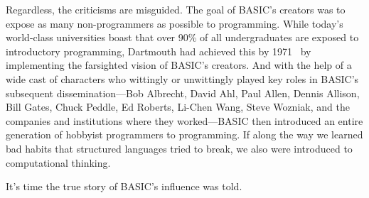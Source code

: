 Regardless, the criticisms are misguided.
The goal of BASIC's creators was to expose as many non-programmers as
possible to programming.
While today's world-class universities boast that over 90\% of all
undergraduates are exposed to introductory programming, Dartmouth had
achieved this by 1971~\cite{man_and_computer} by implementing the
farsighted vision of BASIC's creators.
And with the help of a wide cast of characters who wittingly or
unwittingly played key roles in BASIC's subsequent dissemination---Bob
Albrecht, David Ahl, Paul Allen, Dennis Allison, Bill Gates, Chuck
Peddle, Ed Roberts, Li-Chen Wang, Steve Wozniak, and the companies and
institutions where they worked---BASIC then introduced an entire generation
of hobbyist programmers to programming.
If along the way we learned bad habits that structured languages tried to
break, we also were introduced to computational thinking.

It's time the true story of BASIC's influence was told.
